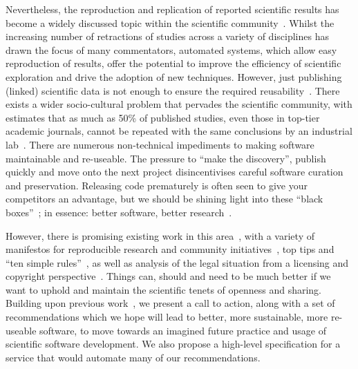 \documentclass[a4paper,11pt]{article}
\begin{document}
Nevertheless, the reproduction and replication of reported scientific
results has become a widely discussed topic within the scientific
community~\cite{barnes:2010,morin-et-al:2012,joppa-et-al:2013}.
Whilst the increasing number of retractions of studies across a
variety of disciplines has drawn the focus of many commentators,
automated systems, which allow easy reproduction of results, offer the
potential to improve the efficiency of scientific exploration and
drive the adoption of new techniques. However, just publishing
(linked) scientific data is not enough to ensure the required
reusability~\cite{bechhofer-et-al:2013}. There exists a wider
socio-cultural problem that pervades the scientific community, with
estimates that as much as 50\% of published studies, even those in
top-tier academic journals, cannot be repeated with the same
conclusions by an industrial
lab~\cite{osherovich:2011,hesman-saey:2015}. There are numerous
non-technical impediments to making software maintainable and
re-useable. The pressure to ``make the discovery'', publish quickly
and move onto the next project disincentivises careful software
curation and preservation. Releasing code prematurely is often seen to
give your competitors an advantage, but we should be shining light
into these ``black boxes''~\cite{morin-et-al:2012}; in essence: better
software, better research~\cite{goble:2014}.

However, there is promising existing work in this
area~\cite{chirigati-et-al:2013,stodden+miguez:2014,stodden-et-al:2015,stodden-et-al:2016},
with a variety of manifestos for reproducible research and community
initiatives~\cite{gent:2013,fursin-et-al:2014,ReproResearch2010,Bailey_setthe,DBLP:journals/corr/JamesWS14},
top tips and ``ten simple
rules''~\cite{prlic+proctor:2012,masum-et-al:2013,sandve-et-al:2013,osborne-et-al:2013,goodman-et-al:2014,crick-et-al-irreprod:2015,list-et-al:2017},
as well as analysis of the legal situation from a licensing and
copyright perspective~\cite{stodden:2008}. Things can, should and need
to be much better if we want to uphold and maintain the scientific
tenets of openness and sharing. Building upon previous
work~\cite{crick-et-al_wssspe2,crick-et-al_recomp2014}, we present a
call to action, along with a set of recommendations which we hope will
lead to better, more sustainable, more re-useable software, to move
towards an imagined future practice and usage of scientific software
development. We also propose a high-level specification for a service
that would automate many of our recommendations.
\end{document}
